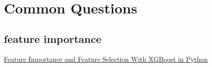 \section{Common Questions}

\subsection{feature importance}

\href{https://machinelearningmastery.com/feature-importance-and-feature-selection-with-xgboost-in-python/}
 { Feature Importance and Feature Selection With XGBoost in Python}



